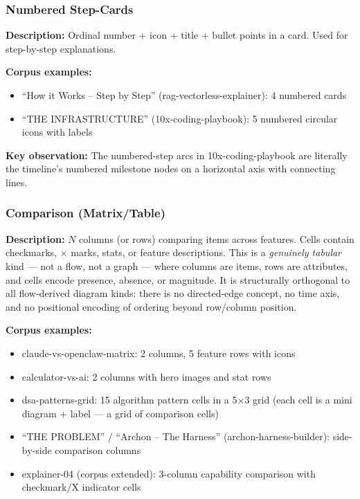 \subsubsection{Numbered Step-Cards}

\textbf{Description:} Ordinal number + icon + title + bullet points in a card. Used for step-by-step explanations.

\textbf{Corpus examples:}
\begin{itemize}
  \item ``How it Works -- Step by Step'' (rag-vectorless-explainer): 4 numbered cards
  \item ``THE INFRASTRUCTURE'' (10x-coding-playbook): 5 numbered circular icons with labels
\end{itemize}

\textbf{Key observation:} The numbered-step arcs in 10x-coding-playbook are literally the timeline's numbered milestone nodes on a horizontal axis with connecting lines.

\subsubsection{Comparison (Matrix/Table)}
\label{sec:corpus-comparison-matrix}

\textbf{Description:} $N$ columns (or rows) comparing items across features.
Cells contain checkmarks, $\times$ marks, stats, or feature descriptions.
This is a \emph{genuinely tabular} kind --- not a flow, not a graph ---
where columns are items, rows are attributes, and cells encode presence,
absence, or magnitude.
It is structurally orthogonal to all flow-derived diagram kinds: there is
no directed-edge concept, no time axis, and no positional encoding of
ordering beyond row/column position.

\textbf{Corpus examples:}
\begin{itemize}
  \item claude-vs-openclaw-matrix: 2 columns, 5 feature rows with icons
  \item calculator-vs-ai: 2 columns with hero images and stat rows
  \item dsa-patterns-grid: 15 algorithm pattern cells in a 5$\times$3 grid
        (each cell is a mini diagram + label --- a grid of comparison cells)
  \item ``THE PROBLEM'' / ``Archon -- The Harness'' (archon-harness-builder):
        side-by-side comparison columns
  \item explainer-04 (corpus extended): 3-column capability comparison with
        checkmark/X indicator cells
\end{itemize}

